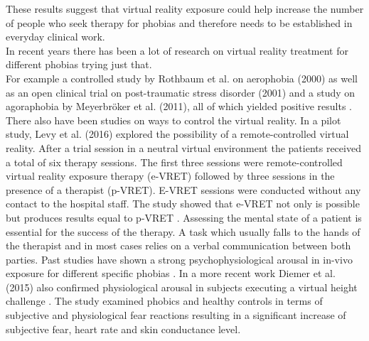 These results suggest that virtual reality exposure could help increase the number of people who seek therapy for phobias and therefore needs to be established in everyday clinical work.\\
In recent years there has been a lot of research on virtual reality treatment for different phobias trying just that.\\
For example a controlled study by Rothbaum et al. on aerophobia (2000) as well as an open clinical trial on post-traumatic stress disorder (2001) and a study on agoraphobia by Meyerbröker et al. (2011), all of which yielded positive results \cite{ROTHBAUM2000} \cite{ROTHBAUM2001} \cite{MEYER2011}.
There also have been studies on ways to control the virtual reality. In a pilot study, Levy et al. (2016) explored the possibility of a remote-controlled virtual reality. After a trial session in a neutral virtual environment the patients received a total of six therapy sessions. The first three sessions were remote-controlled virtual reality exposure therapy (e-VRET) followed by three sessions in the presence of a therapist (p-VRET). E-VRET sessions were conducted without any contact to the hospital staff. The study showed that e-VRET not only is possible but produces results equal to p-VRET \cite{LEVY2016}. %
Assessing the mental state of a patient is essential for the success of the therapy. A task which usually falls to the hands of the therapist and in most cases relies on a verbal communication between both parties.
Past studies have shown a strong psychophysiological arousal in in-vivo exposure for different specific phobias \cite{NESSE1985} \cite{ALPERS2007}. In a more recent work Diemer et al. (2015) also confirmed physiological arousal in subjects executing a virtual height challenge \cite{DIEMER2016}. The study examined phobics and healthy controls in terms of subjective and physiological fear reactions resulting in a significant increase of subjective fear, heart rate and skin conductance level. 
